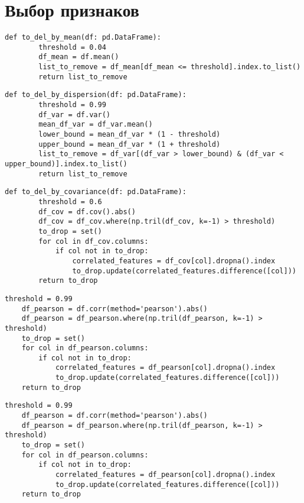 \section{Выбор признаков}

\begin{lstlisting}[label=del_mean, caption={Выбор признаков по математическому ожиданию}]
    def to_del_by_mean(df: pd.DataFrame):
        threshold = 0.04
        df_mean = df.mean()
        list_to_remove = df_mean[df_mean <= threshold].index.to_list()
        return list_to_remove
\end{lstlisting}

\begin{lstlisting}[label=del_var, caption={Выбор признаков по дисперсии}]
    def to_del_by_dispersion(df: pd.DataFrame):
        threshold = 0.99
        df_var = df.var()
        mean_df_var = df_var.mean()
        lower_bound = mean_df_var * (1 - threshold)
        upper_bound = mean_df_var * (1 + threshold)
        list_to_remove = df_var[(df_var > lower_bound) & (df_var < upper_bound)].index.to_list()
        return list_to_remove
\end{lstlisting}

\begin{lstlisting}[label=del_cov, caption={Выбор признаков по ковариации}]
    def to_del_by_covariance(df: pd.DataFrame):
        threshold = 0.6
        df_cov = df.cov().abs()
        df_cov = df_cov.where(np.tril(df_cov, k=-1) > threshold)
        to_drop = set()
        for col in df_cov.columns:
            if col not in to_drop:
                correlated_features = df_cov[col].dropna().index
                to_drop.update(correlated_features.difference([col]))
        return to_drop
\end{lstlisting}

\begin{lstlisting}[label=del_pearson, caption={Выбор признаков по Пирсону}]
    threshold = 0.99
    df_pearson = df.corr(method='pearson').abs()
    df_pearson = df_pearson.where(np.tril(df_pearson, k=-1) > threshold)
    to_drop = set()
    for col in df_pearson.columns:
        if col not in to_drop:
            correlated_features = df_pearson[col].dropna().index
            to_drop.update(correlated_features.difference([col]))
    return to_drop
\end{lstlisting}

\begin{lstlisting}[label=del_spearman, caption={Выбор признаков по Спирмену}]
    threshold = 0.99
    df_pearson = df.corr(method='pearson').abs()
    df_pearson = df_pearson.where(np.tril(df_pearson, k=-1) > threshold)
    to_drop = set()
    for col in df_pearson.columns:
        if col not in to_drop:
            correlated_features = df_pearson[col].dropna().index
            to_drop.update(correlated_features.difference([col]))
    return to_drop
\end{lstlisting}

